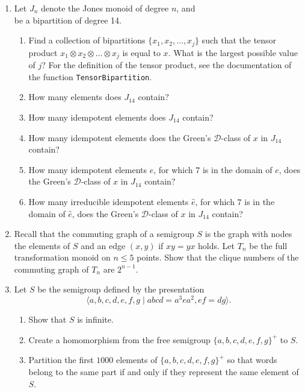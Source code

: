 \documentclass{article}
\begin{document}
\begin{enumerate}
  \item Let $J_n$ denote the Jones monoid of degree $n$, and
    \[
      
    \]
    be a bipartition of degree 14.
    \begin{enumerate}
      \item Find a collection of bipartitions $\{x_1, x_2, \dots,
        x_j\}$ such that the tensor product $x_1 \otimes x_2 \otimes
        \dots \otimes x_j$ is equal to $x$. What is the largest
        possible value of $j$? For the definition of the tensor product, see the
        documentation of the function \texttt{TensorBipartition}.
      \item How many elements does $J_{14}$ contain?
      \item How many idempotent elements does $J_{14}$ contain?
      \item How many idempotent elements does the Green's
        $\mathscr{D}$-class of $x$ in $J_{14}$ contain?
      \item How many idempotent elements $e$, for which $7$ is in the
        domain of $e$, does the Green's $\mathscr{D}$-class of $x$ in
        $J_{14}$ contain?
      \item How many irreducible idempotent elements $\hat{e}$, for
        which $7$ is in the domain of $\hat{e}$, does the Green's
        $\mathscr{D}$-class of $x$ in $J_{14}$ contain?
    \end{enumerate}

  \item
    Recall that the commuting graph of a semigroup  $S$ is the graph with nodes
    the elements of $S$ and an edge $(x, y)$ if $xy = yx$ holds.
    Let $T_n$ be the full transformation monoid on $n \leq 5$ points. Show that
    the clique numbers of the commuting graph of $T_n$ are $2 ^ {n - 1}$.

  \item
    Let $S$ be the semigroup defined by the presentation
    \[
      \langle a, b, c, d, e, f, g \mid abcd = a^3ea^2, ef= dg\rangle.
    \]
    \begin{enumerate}
      \item
        Show that $S$ is infinite.
      \item
        Create a homomorphism from the free semigroup $\{a, b, c, d,
        e, f, g\}^+$ to $S$.
      \item
        Partition the first $1000$ elements of $\{a, b, c, d, e, f, g\}^+$ so
        that words belong to the same part if and only if they represent the
        same element of $S$.
    \end{enumerate}


\end{enumerate}
\end{document}
